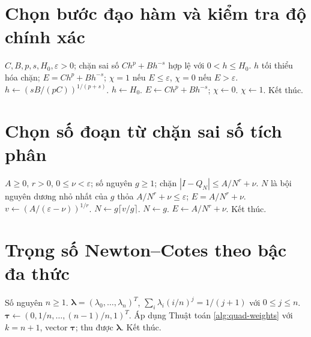 \documentclass[12pt,a4paper,oneside]{book}
\numberwithin{algorithm}{chapter}
\theoremstyle{definition}
\begin{document}
\section{Chọn bước đạo hàm và kiểm tra độ chính xác}
\begin{algorithm}[H]
\caption{Chọn bước theo chặn cắt cụt và nhiễu}
\label{alg:dnum-step-certificate}
\begin{algorithmic}[1]
\Require $C,B,p,s,H_0,\varepsilon>0$; chặn sai số $Ch^p+Bh^{-s}$ hợp lệ với $0<h\leq H_0$.
\Ensure $h$ tối thiểu hóa chặn; $E=Ch^p+Bh^{-s}$; $\chi=1$ nếu $E\leq\varepsilon$, $\chi=0$ nếu $E>\varepsilon$.
\State $h\gets(sB/(pC))^{1/(p+s)}$.
  \State $h\gets H_0$.
\EndIf
\Statex
\State $E\gets Ch^p+Bh^{-s}$; $\chi\gets0$.
  \State $\chi\gets1$.
\EndIf
\Statex
\State Kết thúc.
\end{algorithmic}
\end{algorithm}

\section{Chọn số đoạn từ chặn sai số tích phân}
\begin{algorithm}[H]
\caption{Chọn số đoạn nguyên thỏa độ chính xác và điều kiện bội}
\label{alg:quad-count}
\begin{algorithmic}[1]
\Require $A\geq0$, $r>0$, $0\leq\nu<\varepsilon$; số nguyên $g\geq1$; chặn $|I-Q_N|\leq A/N^r+\nu$.
\Ensure $N$ là bội nguyên dương nhỏ nhất của $g$ thỏa $A/N^r+\nu\leq\varepsilon$; $E=A/N^r+\nu$.
\State $v\gets(A/(\varepsilon-\nu))^{1/r}$.
\State $N\gets g\lceil v/g\rceil$.
  \State $N\gets g$.
\EndIf
\Statex
\State $E\gets A/N^r+\nu$.
\State Kết thúc.
\end{algorithmic}
\end{algorithm}

\section{Trọng số Newton--Cotes theo bậc đa thức}
\begin{algorithm}[H]
\caption{Dựng trọng số Newton--Cotes đóng bậc $n$ -- sơ lược}
\label{alg:quad-nc-degree-weights}
\begin{algorithmic}[1]
\Require Số nguyên $n\geq1$.
\Ensure $\boldsymbol\lambda=(\lambda_0,\ldots,\lambda_n)^T$, $\sum_i\lambda_i(i/n)^j=1/(j+1)$ với $0\leq j\leq n$.
\State $\boldsymbol\tau\gets(0,1/n,\ldots,(n-1)/n,1)^T$.
\State Áp dụng Thuật toán \ref{alg:quad-weights} với $k=n+1$, vector $\boldsymbol\tau$; thu được $\boldsymbol\lambda$.
\State Kết thúc.
\end{algorithmic}
\end{algorithm}
\end{document}
